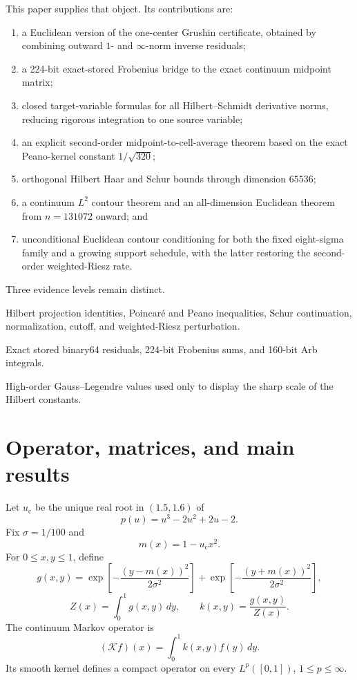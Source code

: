 \documentclass[11pt]{article}
\theoremstyle{definition}
\theoremstyle{remark}
\newcommand{\cK}{\mathcal K}
\newcommand{\uc}{u_{\mathrm c}}
\begin{document}
This paper supplies that object.  Its contributions are:
\begin{enumerate}[leftmargin=2em]
 \item a Euclidean version of the one-center Grushin certificate, obtained
       by combining outward $1$- and $\infty$-norm inverse residuals;
 \item a 224-bit exact-stored Frobenius bridge to the exact continuum
       midpoint matrix;
 \item closed target-variable formulas for all Hilbert--Schmidt derivative
       norms, reducing rigorous integration to one source variable;
 \item an explicit second-order midpoint-to-cell-average theorem based on
       the exact Peano-kernel constant $1/\sqrt{320}$;
 \item orthogonal Hilbert Haar and Schur bounds through dimension $65536$;
 \item a continuum $L^2$ contour theorem and an all-dimension Euclidean
       theorem from $n=131072$ onward; and
 \item unconditional Euclidean contour conditioning for both the fixed
       eight-sigma family and a growing support schedule, with the latter
       restoring the second-order weighted-Riesz rate.
\end{enumerate}

Three evidence levels remain distinct.
\begin{description}[leftmargin=3.25cm,style=nextline]
 \item[Analytic theorem]
 Hilbert projection identities, Poincar\'e and Peano inequalities, Schur
 continuation, normalization, cutoff, and weighted-Riesz perturbation.
 \item[Outward certificate]
 Exact stored binary64 residuals, 224-bit Frobenius sums, and 160-bit Arb
 integrals.
 \item[Floating diagnostic]
 High-order Gauss--Legendre values used only to display the sharp scale of
 the Hilbert constants.
\end{description}

\section{Operator, matrices, and main results}
\label{sec:model}

Let $\uc$ be the unique real root in $(1.5,1.6)$ of
\[
 p(u)=u^3-2u^2+2u-2.
\]
Fix $\sigma=1/100$ and
\[
 m(x)=1-\uc x^2.
\]
For $0\le x,y\le1$, define
\[
 g(x,y)=
 \exp\!\left[-\frac{(y-m(x))^2}{2\sigma^2}\right]
 +
 \exp\!\left[-\frac{(y+m(x))^2}{2\sigma^2}\right],
\]
\[
 Z(x)=\int_0^1g(x,y)\,dy,\qquad
 k(x,y)=\frac{g(x,y)}{Z(x)}.
\]
The continuum Markov operator is
\begin{equation}
 (\cK f)(x)=\int_0^1k(x,y)f(y)\,dy.
 \label{eq:continuum}
\end{equation}
Its smooth kernel defines a compact operator on every $L^p([0,1])$,
$1\le p\le\infty$.
\end{document}
